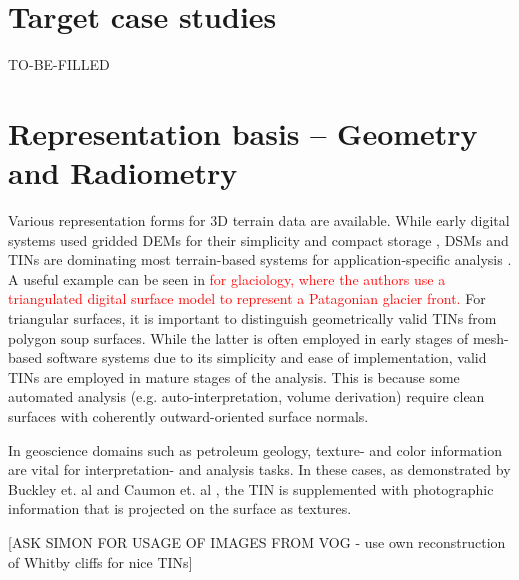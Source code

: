 \documentclass[review]{elsarticle}
\begin{document}
\section{Target case studies}
\label{sec:case_studies}

TO-BE-FILLED

\section{Representation basis -- Geometry and Radiometry}
\label{sec:representations}

Various representation forms for 3D terrain data are available. While early digital systems used gridded \glspl{DEM} for their simplicity and compact storage \cite{Trinks2005,McCaffrey2005}, \glspl{DSM} and \glspl{TIN} are dominating most terrain-based systems for application-specific analysis \cite{Buckley2008a,Caumon2013}. A useful example can be seen in \textcolor{red}{ \cite{Schwalbe2017b} for glaciology, where the authors use a  triangulated digital surface model to represent a Patagonian glacier front.}
For triangular surfaces, it is important to distinguish geometrically valid \glspl{TIN} from polygon soup surfaces. While the latter is often employed in early stages of mesh-based software systems due to its simplicity and ease of implementation, valid \glspl{TIN} are employed in mature stages of the analysis. This is because some automated analysis (e.g. auto-interpretation, volume derivation) require clean surfaces with coherently outward-oriented surface normals.

In geoscience domains such as petroleum geology, texture- and color information are vital for interpretation- and analysis tasks. In these cases, as demonstrated by Buckley et. al \cite{Buckley2008a} and Caumon et. al \cite{Caumon2013}, the \gls{TIN} is supplemented with photographic information that is projected on the surface as textures.%

[ASK SIMON FOR USAGE OF IMAGES FROM VOG - use own reconstruction of Whitby cliffs for nice TINs]
\end{document}
